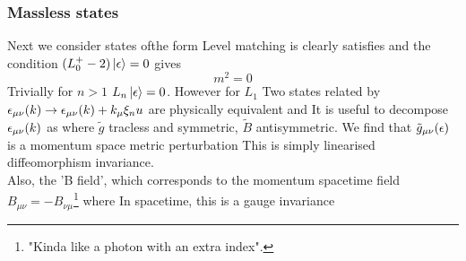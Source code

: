 \documentclass{article}
\begin{document}
\subsubsection*{Massless states}
Next we consider states ofthe form  
Level matching is clearly satisfies and the condition $(L_0^+-2) \ket{\epsilon} = 0$ gives 
\[
m^2 = 0
\]
Trivially for $n>1$ $L_n\ket{\epsilon}=0$. However for $L_1$ 
Two states related by $\epsilon_{\mu\nu}(k) \to \epsilon_{\mu\nu}(k) + k_\mu \xi_
nu$ are physically equivalent and
It is useful to decompose $\epsilon_{\mu\nu}(k)$ as 
where $\tilde{g}$ tracless and symmetric, $\tilde{B}$ antisymmetric. We find that $\tilde{g}_{\mu\nu}(\epsilon)$ is a momentum space metric perturbation 
This is simply linearised diffeomorphism invariance. \\
Also, the 'B field', which corresponds to the momentum spacetime field $B_{\mu\nu}=-B_{\nu\mu}$\footnote{"Kinda like a photon with an extra index".} where
In spacetime, this is a gauge invariance 
\end{document}
